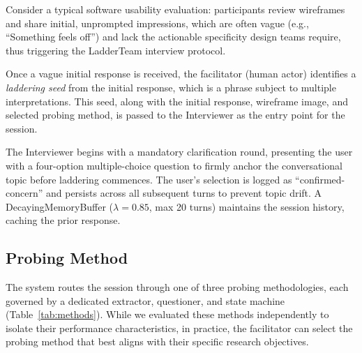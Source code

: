 \documentclass[sigconf,authordraft]{acmart}
\begin{document}

Consider a typical software usability evaluation: participants review wireframes and share initial, unprompted impressions, which are often vague (e.g., ``Something feels off'') and lack the actionable specificity design teams require, thus triggering the LadderTeam interview protocol.

Once a vague initial response is received, the facilitator (human actor) identifies a \emph{laddering seed} from the initial response, which is a phrase subject to multiple interpretations. This seed, along with the initial response, wireframe image, and selected probing method, is passed to the Interviewer as the entry point for the
session.

The Interviewer begins with a mandatory clarification round, presenting the user with a four-option multiple-choice question to firmly anchor the conversational topic before laddering commences. The user's selection is logged as ``confirmed-concern'' and persists across all subsequent turns to prevent topic drift. A DecayingMemoryBuffer ($\lambda = 0.85$, max 20 turns) maintains the session history, caching the prior response. 

\subsection{Probing Method}\label{sec:probing}
The system routes the session through one of three probing methodologies, each governed by a dedicated extractor, questioner, and state machine (Table~\ref{tab:methods}). While we evaluated these methods independently to isolate their performance characteristics, in practice, the facilitator can select the probing method that best aligns with their specific research objectives.
\end{document}
